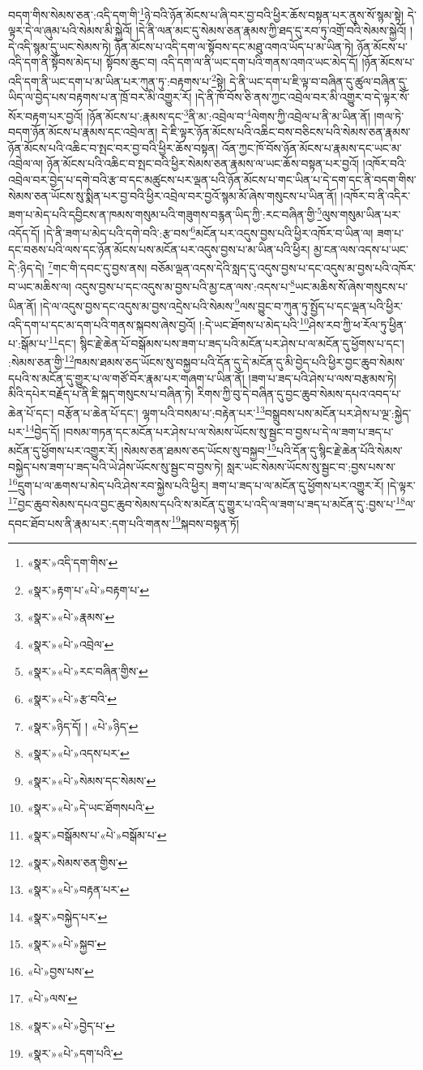 བདག་གིས་སེམས་ཅན་:འདི་དག་གི་\footnote{«སྣར་»འདི་དག་གིས་}ཉེ་བའི་ཉོན་མོངས་པ་ཞི་བར་བྱ་བའི་ཕྱིར་ཆོས་བསྟན་པར་ནུས་སོ་སྙམ་སྟེ། དེ་ལྟར་དེ་ལ་ཞུམ་པའི་སེམས་མི་སྐྱེའོ། །དེ་ནི་ལན་མང་དུ་སེམས་ཅན་རྣམས་ཀྱི་ཐད་དུ་རབ་ཏུ་འགྲོ་བའི་སེམས་སྐྱེའོ། །དེ་འདི་སྙམ་དུ་ཡང་སེམས་ཏེ། ཉོན་མོངས་པ་འདི་དག་ལ་སྟོབས་དང་མཐུ་འགའ་ཡོད་པ་མ་ཡིན་ཏེ། ཉོན་མོངས་པ་འདི་དག་ནི་སྟོབས་མེད་པ། སྟོབས་ཆུང་བ། འདི་དག་ལ་ནི་ཡང་དག་པའི་གནས་འགའ་ཡང་མེད་དོ། །ཉོན་མོངས་པ་འདི་དག་ནི་ཡང་དག་པ་མ་ཡིན་པར་ཀུན་ཏུ་:བརྟགས་པ་\footnote{«སྣར་»རྟག་པ་«པེ་»བརྟག་པ་}སྟེ། དེ་ནི་ཡང་དག་པ་ཇི་ལྟ་བ་བཞིན་དུ་ཚུལ་བཞིན་དུ་ཡིད་ལ་བྱེད་པས་བརྟགས་པ་ན་ཁྲོ་བར་མི་འགྱུར་རོ། །དེ་ནི་ཁོ་བོས་ཅི་ནས་ཀྱང་འབྲེལ་བར་མི་འགྱུར་བ་དེ་ལྟར་སོ་སོར་བརྟག་པར་བྱའོ། །ཉོན་མོངས་པ་:རྣམས་དང་\footnote{«སྣར་»«པེ་»རྣམས་}ནི་མ་:འབྲེལ་བ་\footnote{«སྣར་»«པེ་»འབྲེལ་}ལེགས་ཀྱི་འབྲེལ་པ་ནི་མ་ཡིན་ནོ། །གལ་ཏེ་བདག་ཉོན་མོངས་པ་རྣམས་དང་འབྲེལ་ན། དེ་ཇི་ལྟར་ཉོན་མོངས་པའི་འཆིང་བས་བཅིངས་པའི་སེམས་ཅན་རྣམས་ཉོན་མོངས་པའི་འཆིང་བ་སྤང་བར་བྱ་བའི་ཕྱིར་ཆོས་བསྟན། འོན་ཀྱང་ཁོ་བོས་ཉོན་མོངས་པ་རྣམས་དང་ཡང་མ་འབྲེལ་ལ། ཉོན་མོངས་པའི་འཆིང་བ་སྤང་བའི་ཕྱིར་སེམས་ཅན་རྣམས་ལ་ཡང་ཆོས་བསྟན་པར་བྱའོ། །འཁོར་བའི་འབྲེལ་བར་བྱེད་པ་དགེ་བའི་རྩ་བ་དང་མཚུངས་པར་ལྡན་པའི་ཉོན་མོངས་པ་གང་ཡིན་པ་དེ་དག་དང་ནི་བདག་གིས་སེམས་ཅན་ཡོངས་སུ་སྨིན་པར་བྱ་བའི་ཕྱིར་འབྲེལ་བར་བྱའོ་སྙམ་མོ་ཞེས་གསུངས་པ་ཡིན་ནོ། །འཁོར་བ་ནི་འདིར་ཟག་པ་མེད་པའི་དབྱིངས་ན་ཁམས་གསུམ་པའི་གཟུགས་བརྙན་ཡིད་ཀྱི་:རང་བཞིན་གྱི་\footnote{«སྣར་»«པེ་»རང་བཞིན་གྱིས་}ལུས་གསུམ་ཡིན་པར་འདོད་དོ། །དེ་ནི་ཟག་པ་མེད་པའི་དགེ་བའི་:རྩ་བས་\footnote{«སྣར་»«པེ་»རྩ་བའི་}མངོན་པར་འདུས་བྱས་པའི་ཕྱིར་འཁོར་བ་ཡིན་ལ། ཟག་པ་དང་བཅས་པའི་ལས་དང་ཉོན་མོངས་པས་མངོན་པར་འདུས་བྱས་པ་མ་ཡིན་པའི་ཕྱིར། མྱ་ངན་ལས་འདས་པ་ཡང་དེ་:ཉིད་དེ། \footnote{«སྣར་»ཉིད་དོ། ། «པེ་»ཉིད་}གང་གི་དབང་དུ་བྱས་ནས། བཅོམ་ལྡན་འདས་དེའི་སླད་དུ་འདུས་བྱས་པ་དང་འདུས་མ་བྱས་པའི་འཁོར་བ་ཡང་མཆིས་ལ། འདུས་བྱས་པ་དང་འདུས་མ་བྱས་པའི་མྱ་ངན་ལས་:འདས་པ་\footnote{«སྣར་»«པེ་»འདས་པར་}ཡང་མཆིས་སོ་ཞེས་གསུངས་པ་ཡིན་ནོ། །དེ་ལ་འདུས་བྱས་དང་འདུས་མ་བྱས་འདྲེས་པའི་སེམས་\footnote{«སྣར་»«པེ་»སེམས་དང་སེམས་}ལས་བྱུང་བ་ཀུན་ཏུ་སྤྱོད་པ་དང་ལྡན་པའི་ཕྱིར་འདི་དག་པ་དང་མ་དག་པའི་གནས་སྐབས་ཞེས་བྱའོ། །:དེ་ཡང་ཐོགས་པ་མེད་པའི་\footnote{«སྣར་»«པེ་»དེ་ཡང་ཐོགསཔའི་}ཤེས་རབ་ཀྱི་ཕ་རོལ་ཏུ་ཕྱིན་པ་:སྒོམ་པ་\footnote{«སྣར་»བསྒོམས་པ་«པེ་»བསྒོམ་པ་}དང་། སྙིང་རྗེ་ཆེན་པོ་བསྒོམས་པས་ཟག་པ་ཟད་པའི་མངོན་པར་ཤེས་པ་ལ་མངོན་དུ་ཕྱོགས་པ་དང་། :སེམས་ཅན་གྱི་\footnote{«སྣར་»སེམས་ཅན་གྱིས་}ཁམས་ཐམས་ཅད་ཡོངས་སུ་བསྐྱབ་པའི་དོན་དུ་དེ་མངོན་དུ་མི་བྱེད་པའི་ཕྱིར་བྱང་ཆུབ་སེམས་དཔའི་ས་མངོན་དུ་གྱུར་པ་ལ་གཙོ་བོར་རྣམ་པར་གཞག་པ་ཡིན་ནོ། །ཟག་པ་ཟད་པའི་ཤེས་པ་ལས་བརྩམས་ཏེ། མིའི་དཔེར་བརྗོད་པ་ནི་ཇི་སྐད་གསུངས་པ་བཞིན་ཏེ། རིགས་ཀྱི་བུ་དེ་བཞིན་དུ་བྱང་ཆུབ་སེམས་དཔའ་འབད་པ་ཆེན་པོ་དང་། བརྩོན་པ་ཆེན་པོ་དང་། ལྷག་པའི་བསམ་པ་:བརྟེན་པར་\footnote{«སྣར་»«པེ་»བརྟན་པར་}བསྒྲུབས་པས་མངོན་པར་ཤེས་པ་ལྔ་:སྐྱེད་པར་\footnote{«སྣར་»བསྐྱེད་པར་}བྱེད་དོ། །བསམ་གཏན་དང་མངོན་པར་ཤེས་པ་ལ་སེམས་ཡོངས་སུ་སྦྱང་བ་བྱས་པ་དེ་ལ་ཟག་པ་ཟད་པ་མངོན་དུ་ཕྱོགས་པར་འགྱུར་རོ། །སེམས་ཅན་ཐམས་ཅད་ཡོངས་སུ་བསྐྱབ་\footnote{«སྣར་»«པེ་»སྐྱབ་}པའི་དོན་དུ་སྙིང་རྗེ་ཆེན་པོའི་སེམས་བསྐྱེད་པས་ཟག་པ་ཟད་པའི་ཡེ་ཤེས་ཡོངས་སུ་སྦྱང་བ་བྱས་ཏེ། སླར་ཡང་སེམས་ཡོངས་སུ་སྦྱང་བ་:བྱས་པས་ས་\footnote{«པེ་»བྱས་པས་}དྲུག་པ་ལ་ཆགས་པ་མེད་པའི་ཤེས་རབ་སྐྱེས་པའི་ཕྱིར། ཟག་པ་ཟད་པ་ལ་མངོན་དུ་ཕྱོགས་པར་འགྱུར་རོ། །དེ་ལྟར་\footnote{«པེ་»ལས་}བྱང་ཆུབ་སེམས་དཔའ་བྱང་ཆུབ་སེམས་དཔའི་ས་མངོན་དུ་གྱུར་པ་འདི་ལ་ཟག་པ་ཟད་པ་མངོན་དུ་:བྱས་པ་\footnote{«སྣར་»«པེ་»བྱེད་པ་}ལ་དབང་ཐོབ་པས་ནི་རྣམ་པར་:དག་པའི་གནས་\footnote{«སྣར་»«པེ་»དག་པའི་}སྐབས་བསྟན་ཏོ། 